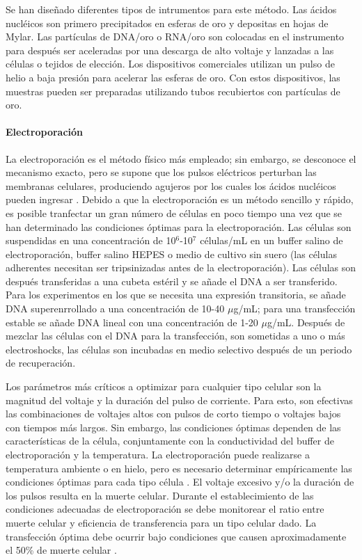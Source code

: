 \documentclass[fleqn,10pt]{SelfArx} %
\begin{document}
Se han diseñado diferentes tipos de intrumentos para este método. Las ácidos nucléicos son primero precipitados en esferas de oro y depositas en hojas de Mylar. Las partículas de DNA/oro o RNA/oro son colocadas en el instrumento para después ser aceleradas por una descarga de alto voltaje y lanzadas a las células o tejidos de elección. Los dispositivos comerciales utilizan un pulso de helio a baja presión para acelerar las esferas de oro. Con estos dispositivos, las muestras pueden ser preparadas utilizando tubos recubiertos con partículas de oro. 

\paragraph*{Electroporación}
La electroporación es el método físico más empleado; sin embargo, se desconoce el mecanismo exacto, pero se supone que los pulsos eléctricos perturban las membranas celulares, produciendo agujeros por los cuales los ácidos nucléicos pueden ingresar \cite{Inoue:2001aa}. Debido a que la electroporación es un método sencillo y rápido, es posible tranfectar un gran número de células en poco tiempo una vez que se han determinado las condiciones óptimas para la electroporación.  Las células son suspendidas en una concentración de 10$^6$-10$^7$ células/mL en un buffer salino de electroporación, buffer salino HEPES o medio de cultivo sin suero (las células adherentes necesitan ser tripsinizadas antes de la electroporación). Las células son después transferidas a una cubeta estéril y se añade el DNA a ser transferido. Para los experimentos en los que se necesita una expresión transitoria, se añade DNA superenrrollado a una concentración de 10-40 $\mu$g/mL; para una transfección estable se añade DNA lineal con una concentración de 1-20 $\mu$g/mL.  Después de mezclar las células con el DNA para la transfección, son sometidas a uno o más electroshocks, las células son incubadas en medio selectivo después de un periodo de recuperación. 

Los parámetros más críticos a optimizar para cualquier tipo celular son la magnitud del voltaje y la duración del pulso de corriente. Para esto, son efectivas las combinaciones de voltajes altos con pulsos de corto tiempo o voltajes bajos con tiempos más largos. Sin embargo, las condiciones óptimas dependen de las características de la célula, conjuntamente con la conductividad del buffer de electroporación y la temperatura. La electroporación puede realizarse a temperatura ambiente o en hielo, pero es necesario determinar empíricamente las condiciones óptimas para cada tipo célula \cite{Chu11021987}.  El voltaje excesivo y/o la duración de los pulsos resulta en la muerte celular. Durante el establecimiento de las condiciones adecuadas  de electroporación se debe monitorear el ratio entre muerte celular y eficiencia de transferencia para un tipo celular dado. La transfección óptima debe ocurrir bajo condiciones que  causen aproximadamente el 50\% de muerte celular \cite{Schenborn}.
\end{document}
